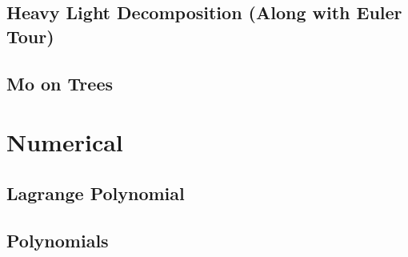 \subsection{Heavy Light Decomposition (Along with Euler Tour)}
\vspace{-2ex}
\raggedbottom
\vspace{-3.2ex}
\hrulefill
\subsection{Mo on Trees}
\vspace{-2ex}
\raggedbottom
\vspace{-3.2ex}
\hrulefill

\section{Numerical}
\subsection{Lagrange Polynomial}
\vspace{-2ex}
\raggedbottom
\vspace{-3.2ex}
\hrulefill
\subsection{Polynomials}
\vspace{-2ex}
\raggedbottom
\vspace{-3.2ex}
\hrulefill

